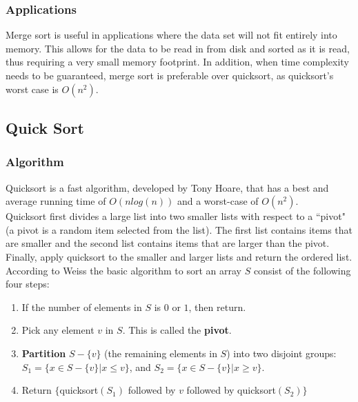\documentclass{article}
\begin{document}
      \subsubsection{Applications}
        Merge sort is useful in applications where the data set will not fit
        entirely into memory.  This allows for the data to be read in from disk
        and sorted as it is read, thus requiring a very small memory footprint.
        In addition, when time complexity needs to be guaranteed, merge sort is
        preferable over quicksort, as quicksort's worst case is $O(n^2)$.
   \subsection{Quick Sort}
      \subsubsection{Algorithm}Quicksort is a fast algorithm, developed
by Tony Hoare, that has a 
best and average running time of $O(nlog(n))$ and a worst-case  of
$O(n^2)$.\\
Quicksort first divides a large list into two smaller lists with respect
to a ``pivot" (a pivot is a random item selected from the list). The 
first list contains items that are smaller and the second list contains 
items that are larger than the pivot. Finally, apply quicksort to the
smaller and larger lists and return the ordered list. 
According to Weiss\cite{weiss}  the basic algorithm to sort an array $S$ 
consist of the following four steps:
\begin{enumerate}
\item If the number of elements in $S$ is $0$ or $1$, then return.
\item Pick any element $v$ in $S$. This is called the \textbf{pivot}.
\item \textbf{Partition} $S - \{v\}$ (the remaining elements in $S$)
into two disjoint groups: $S_1 = \{x \in S - \{v\}|x\leq v\}$, and $S_2
= \{x \in S - \{v\}|x \geq v\}$.
\item Return $\{$quicksort$(S_1)$ followed by $v$ followed by
quicksort$(S_2)\}$
\end{enumerate}
\end{document}
